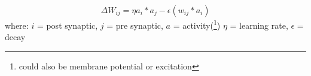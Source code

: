 \begin{equation}
  \label{eq:1}
  \Delta W_{ij} = \eta a_i*a_j - \epsilon (w_{ij} * a_i)
\end{equation}
where:
$i$ = post synaptic, 
$j$ = pre synaptic, 
$a$ = activity(\footnote{could also be membrane potential or excitation})
$\eta$ = learning rate, 
$\epsilon$ = decay

